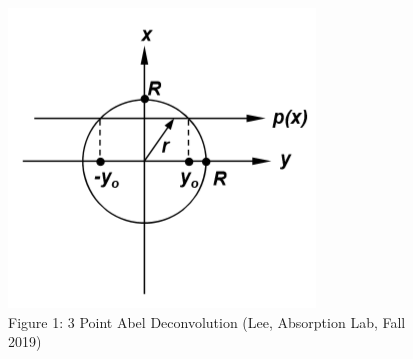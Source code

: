 \documentclass{article}
\begin{document}
\begin{figure}[h]
    \centering
    \includegraphics[width=.6\textwidth]{3pointAbelDeconvolution.PNG}
    \caption*{\footnotesize{Figure 1: 3 Point Abel Deconvolution  (Lee, Absorption Lab, Fall 2019)}}
\end{figure}


$$$$
\end{document}

